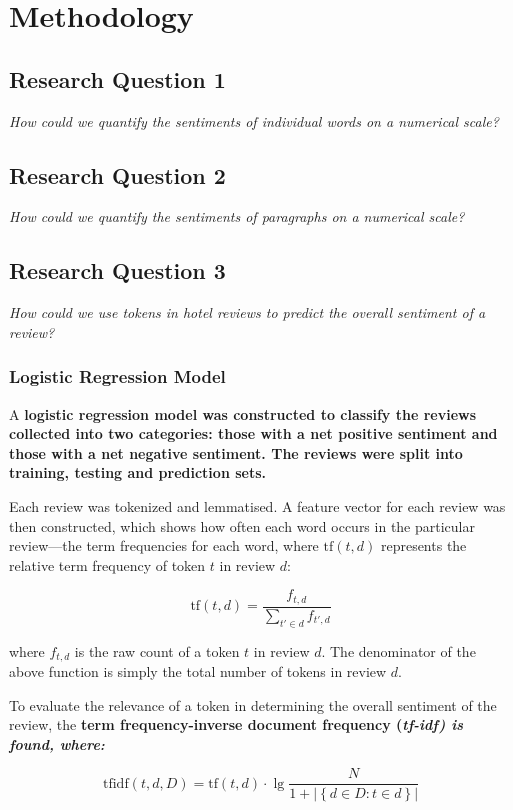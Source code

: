 \documentclass[12pt,bibliography=totocnumbered]{scrartcl}
\begin{document}
\section{Methodology}
\subsection{Research Question 1}
\it{How could we quantify the sentiments of individual words on a numerical scale?}
\subsection{Research Question 2}
\it{How could we quantify the sentiments of paragraphs on a numerical scale?}
\subsection{Research Question 3}
\it{How could we use tokens in hotel reviews to predict the overall sentiment of a review?}
\subsubsection{Logistic Regression Model}
A \bf{logistic regression model} was constructed to classify the reviews collected into
two categories: those with a net positive sentiment and those with a net negative sentiment.
The reviews were split into training, testing and prediction sets.

Each review was tokenized and lemmatised. A feature vector for each review was
then constructed, which shows how often each word occurs in the particular review---the
term frequencies for each word, where $\text{tf}(t,d)$ represents the relative term frequency of
token $t$ in review $d$:

\begin{equation}
	\text{tf}(t,d) = \frac{f_{t,d}}{\sum_{t'\in d}^{}f_{t',d}}
	\label{eq:tf}
\end{equation}

where $f_{t,d}$ is the raw count of a token $t$ in review $d$. The denominator of the above
function is simply the total number of tokens in review $d$.

To evaluate the relevance of a token in determining the overall sentiment of the
review, the \bf{term frequency-inverse document frequency} (\it{tf-idf}) is found, where:

\begin{equation}
	\text{tfidf}(t,d,D) = \text{tf}(t,d)\cdot\lg\frac{N}{1+\left|\left\{d\in D : t\in d\right\}\right|}
	\label{eq:tfidf}
\end{equation}
\end{document}
